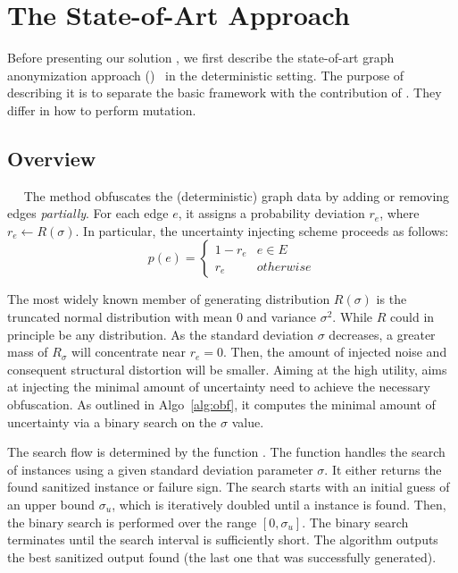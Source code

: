 \section{The State-of-Art Approach}
\label{sec:soa}
Before presenting our solution {\methodName}, we first describe the state-of-art graph anonymization approach ({\soaName})~\cite{Boldi_Injecting_2012} in the deterministic setting. 
The purpose of describing it is to separate the basic framework with the contribution of {\methodName}. 
They differ in how to perform mutation. 

\subsection{Overview}~~
The {\soaName} method obfuscates the (deterministic) graph data by adding or removing edges \emph{partially}. 
For each edge $e$, it assigns a probability deviation $r_{e}$, where $r_{e} \leftarrow R(\sigma)$. 
In particular, the uncertainty injecting scheme proceeds as follows:
\begin{equation}
    p(e) =
    \begin{cases}
         1-r_{e}  & e \in E \\
         r_{e}    & otherwise 
    \end{cases}
    \label{eq:inject}
\end{equation}

The most widely known member of generating distribution $R({\sigma})$ is the truncated normal distribution with mean 0 and variance $\sigma^2$. 
While $R$ could in principle be any distribution. 
As the standard deviation $\sigma$ decreases, a greater mass of $R_{\sigma}$ will concentrate near $r_{e}=0$.  
Then, the amount of injected noise and consequent structural distortion will be smaller. 
Aiming at the high utility, {\soaName} aims at injecting the minimal amount of uncertainty need to achieve the necessary obfuscation. 
As outlined in Algo~\ref{alg:obf}, it computes the minimal amount of uncertainty via a binary search on the $\sigma$ value. 


The search flow is determined by the function {\genobf}. The function {\genobf} handles the search of {\keobf} instances using a given standard deviation parameter $\sigma$. It either returns the found sanitized instance or failure sign.
The search starts with an initial guess of an upper bound $\sigma_{u}$, which is iteratively doubled until a {\keobf} instance is found. Then, the binary search is performed over the range $[0,\sigma_{u}]$. The binary search terminates until the search interval is sufficiently short. The algorithm outputs the best sanitized output found (the last one that was successfully generated).

